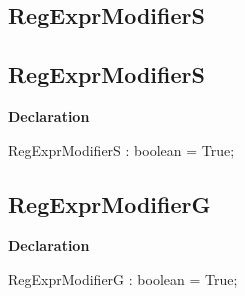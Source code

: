 \documentclass{report}
\newif\ifpdf
\begin{document}
\subsection*{\large{\textbf{RegExprModifierS}}\normalsize\hspace{1ex}\hrulefill}
\else
\subsection*{RegExprModifierS}
\fi
\label{RegExpr-RegExprModifierS}
\begin{list}{}{
\setlength{\itemindent}{0cm}
\setlength{\listparindent}{0cm}
\setlength{\leftmargin}{\evensidemargin}
\addtolength{\leftmargin}{\tmplength}
\settowidth{\labelsep}{X}
\addtolength{\leftmargin}{\labelsep}
\setlength{\labelwidth}{\tmplength}
}
\item[\textbf{Declaration}\hfill]
\ifpdf
\begin{flushleft}
\fi
\begin{ttfamily}
RegExprModifierS : boolean = True;\end{ttfamily}

\ifpdf
\end{flushleft}
\fi

\end{list}
\ifpdf
\subsection*{\large{\textbf{RegExprModifierG}}\normalsize\hspace{1ex}\hrulefill}
\else
\subsection*{RegExprModifierG}
\fi
\label{RegExpr-RegExprModifierG}
\begin{list}{}{
\setlength{\itemindent}{0cm}
\setlength{\listparindent}{0cm}
\setlength{\leftmargin}{\evensidemargin}
\addtolength{\leftmargin}{\tmplength}
\settowidth{\labelsep}{X}
\addtolength{\leftmargin}{\labelsep}
\setlength{\labelwidth}{\tmplength}
}
\item[\textbf{Declaration}\hfill]
\ifpdf
\begin{flushleft}
\fi
\begin{ttfamily}
RegExprModifierG : boolean = True;\end{ttfamily}

\ifpdf
\end{flushleft}
\fi

\end{list}
\ifpdf
\end{document}
